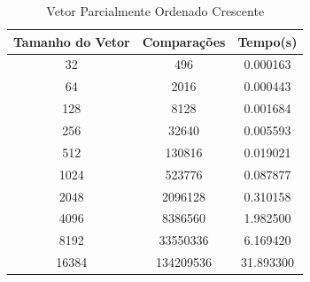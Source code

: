 \documentclass[12pt,a4paper,twoside]{report}
\begin{document}
\begin{table}[h]
  \centering
  \caption{Vetor Parcialmente Ordenado Crescente \label{tab:poc}}
  \begin{tabular}{ccc} \\\hline
  \textbf{Tamanho do Vetor} & \textbf{Comparações} & \textbf{Tempo(s)} \\\hline
  32                        & 496                  & 0.000163          \\\hline
  64                        & 2016                 & 0.000443          \\\hline
  128                       & 8128                 & 0.001684          \\\hline
  256                       & 32640                & 0.005593          \\\hline
  512                       & 130816               & 0.019021          \\\hline
  1024                      & 523776               & 0.087877          \\\hline
  2048                      & 2096128              & 0.310158          \\\hline
  4096                      & 8386560              & 1.982500         \\\hline
  8192                      & 33550336             & 6.169420        \\\hline
  16384                     & 134209536            & 31.893300        \\\hline
  \end{tabular}
\end{table}
\end{document}
